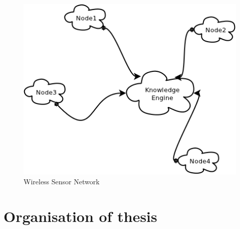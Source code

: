 \begin{figure}
\begin{center}
 \includegraphics{../Figures/wsn.png}
 \caption{Wireless Sensor Network}
 \label{fig2}
\end{center} 
\end{figure} 


\section{Organisation of thesis}
